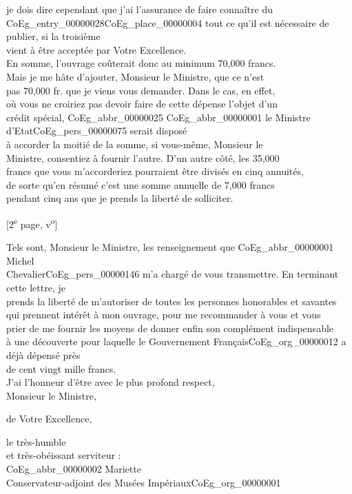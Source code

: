 \documentclass{book}
\begin{document}
je dois dire cependant que j’ai l’assurance de faire connaître du\\
\Gls{CoEg_entry_00000028}\gls{CoEg_place_00000004} tout ce qu’il est nécessaire de publier, si la troisième\\
vient à être acceptée par Votre Excellence.\\
\indent En somme, l’ouvrage coûterait donc au minimum 70,000 francs.\\
Mais je me hâte d’ajouter, Monsieur le Ministre, que ce n’est\\
pas 70,000 fr. que je viens vous demander. Dans le cas, en effet,\\
où vous ne croiriez pas devoir faire de cette dépense l’objet d’un\\
crédit spécial, \gls{CoEg_abbr_00000025} \gls{CoEg_abbr_00000001} le Ministre d’Etat\gls{CoEg_pers_00000075} serait disposé\\
à accorder la moitié de la somme, si vous-même, Monsieur le\\
Ministre, consentiez à fournir l’autre. D’un autre côté, les 35,000\\
francs que vous m’accorderiez pourraient être divisés en cinq annuités,\\
de sorte qu’en résumé c’est une somme annuelle de 7,000 francs\\
pendant cinq ans que je prends la liberté de solliciter.
{\footnotesize\begin{center} {[2\textsuperscript{e} page, v\textsuperscript{o}]}\end{center}}
\indent Tels sont, Monsieur le Ministre, les renseignement que \gls{CoEg_abbr_00000001} Michel\\
Chevalier\gls{CoEg_pers_00000146} m’a chargé de vous transmettre. En terminant cette lettre, je\\
prends la liberté de m’autoriser de toutes les personnes honorables et savantes\\
qui prennent intérêt à mon ouvrage, pour me recommander à vous et vous\\
prier de me fournir les moyens de donner enfin son complément indispensable\\
à une découverte pour laquelle le Gouvernement Français\gls{CoEg_org_00000012} a déjà dépensé près\\
de cent vingt mille francs.\\
\indent J’ai l’honneur d’être avec le plus profond respect,\\
\indent Monsieur le Ministre,
\begin{center}de Votre Excellence,\end{center}
\begin{center}\hspace{5cm}le très-humble\\
\hspace{5cm}et très-obéissant serviteur :\\
\hspace{5cm}\gls{CoEg_abbr_00000002} Mariette\\
\hspace{5cm}Conservateur-adjoint des Musées Impériaux\gls{CoEg_org_00000001}\end{center}
\end{document}
